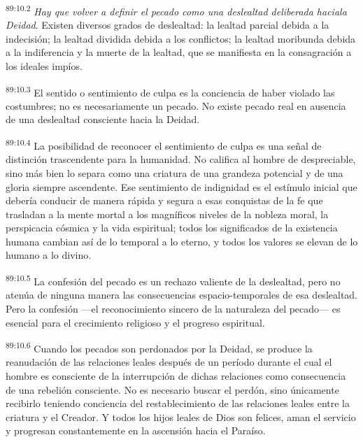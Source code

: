 \documentclass[twoside, 11pt]{book}
\begin{document}
\par
\textsuperscript{89:10.2} \textit{Hay que volver a definir el pecado como una deslealtad deliberada haciala Deidad}. Existen diversos grados de deslealtad: la lealtad parcial debida a la indecisión; la lealtad dividida debida a los conflictos; la lealtad moribunda debida a la indiferencia y la muerte de la lealtad, que se manifiesta en la consagración a los ideales impíos.

\par
\textsuperscript{89:10.3} El sentido o sentimiento de culpa es la conciencia de haber violado las costumbres; no es necesariamente un pecado. No existe pecado real en ausencia de una deslealtad consciente hacia la Deidad.

\par
\textsuperscript{89:10.4} La posibilidad de reconocer el sentimiento de culpa es una señal de distinción trascendente para la humanidad. No califica al hombre de despreciable, sino más bien lo separa como una criatura de una grandeza potencial y de una gloria siempre ascendente. Ese sentimiento de indignidad es el estímulo inicial que debería conducir de manera rápida y segura a esas conquistas de la fe que trasladan a la mente mortal a los magníficos niveles de la nobleza moral, la perspicacia cósmica y la vida espiritual; todos los significados de la existencia humana cambian así de lo temporal a lo eterno, y todos los valores se elevan de lo humano a lo divino.

\par
\textsuperscript{89:10.5} La confesión del pecado es un rechazo valiente de la deslealtad, pero no atenúa de ninguna manera las consecuencias espacio-temporales de esa deslealtad. Pero la confesión ---el reconocimiento sincero de la naturaleza del pecado--- es esencial para el crecimiento religioso y el progreso espiritual.

\par
\textsuperscript{89:10.6} Cuando los pecados son perdonados por la Deidad, se produce la reanudación de las relaciones leales después de un período durante el cual el hombre es consciente de la interrupción de dichas relaciones como consecuencia de una rebelión consciente. No es necesario buscar el perdón, sino únicamente recibirlo teniendo conciencia del restablecimiento de las relaciones leales entre la criatura y el Creador. Y todos los hijos leales de Dios son felices, aman el servicio y progresan constantemente en la ascensión hacia el Paraíso.
\end{document}
